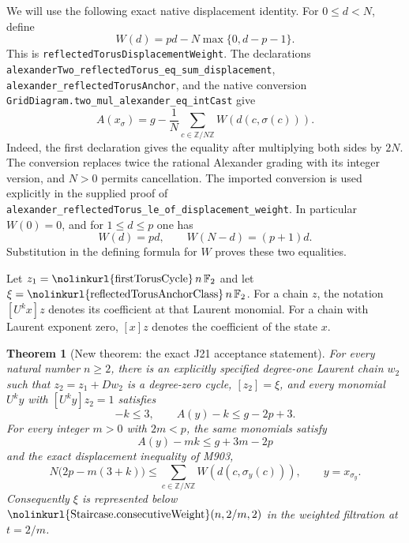 \documentclass[11pt,oneside]{report}
\newtheorem{theorem}{Theorem}[section]
\theoremstyle{definition}
\numberwithin{equation}{section}
\newcommand{\F}{\mathbb F_2}
\newcommand{\Z}{\mathbb Z}
\newcommand{\decl}[1]{\textnormal{\nolinkurl{#1}}}
\begin{document}
We will use the following exact native displacement identity.
For $0\leq d<N$, define
\[
 W(d)=pd-N\max\{0,d-p-1\}.
\]
This is \decl{reflectedTorusDisplacementWeight}. The declarations
\decl{alexanderTwo_reflectedTorus_eq_sum_displacement},
\decl{alexander_reflectedTorusAnchor}, and the native conversion
\decl{GridDiagram.two_mul_alexander_eq_intCast} give
\begin{equation}
 A(x_\sigma)=g-\frac1N\sum_{c\in\Z/N\Z}W(d(c,\sigma(c))).
\label{J21:eq:torus-native-alexander}
\end{equation}
Indeed, the first declaration gives the equality after multiplying both
sides by $2N$. The conversion replaces twice the rational Alexander
grading with its integer version, and $N>0$ permits cancellation.
The imported conversion is used explicitly in the supplied proof of
\decl{alexander_reflectedTorus_le_of_displacement_weight}.
In particular $W(0)=0$, and for $1\leq d\leq p$ one has
\begin{equation}
                       W(d)=pd,\qquad W(N-d)=(p+1)d.
\label{J21:eq:torus-weight-two-slopes}
\end{equation}
Substitution in the defining formula for $W$ proves these two equalities.

Let $z_1=\decl{firstTorusCycle}\,n\,\F$ and let
$\xi=\decl{reflectedTorusAnchorClass}\,n\,\F$.
For a chain $z$, the notation $[U^k x]z$ denotes its coefficient at that
Laurent monomial. For a chain with Laurent exponent zero, $[x]z$ denotes
the coefficient of the state $x$.

\begin{theorem}[New theorem: the exact J21 acceptance statement]
\label{J21:thm:j21-main}
For every natural number $n\geq2$, there is an explicitly specified degree-one
Laurent chain $w_2$ such that $z_2=z_1+Dw_2$ is a degree-zero cycle,
$[z_2]=\xi$, and every monomial $U^k y$ with $[U^k y]z_2=1$ satisfies
\begin{equation}
                 -k\leq3,\qquad A(y)-k\leq g-2p+3.
\label{J21:eq:j21-strong-corner}
\end{equation}
For every integer $m>0$ with $2m<p$, the same monomials satisfy
\begin{equation}
                  A(y)-mk\leq g+3m-2p
\label{J21:eq:j21-weighted-target}
\end{equation}
and the exact displacement inequality of M903,
\begin{equation}
 N\bigl(2p-m(3+k)\bigr)
       \leq\sum_{c\in\Z/N\Z}W(d(c,\sigma_y(c))),
 \qquad y=x_{\sigma_y}.
\label{J21:eq:j21-M903-target}
\end{equation}
Consequently $\xi$ is represented below
$\decl{Staircase.consecutiveWeight}(n,2/m,2)$ in the weighted filtration
at $t=2/m$.
\end{theorem}
\end{document}
